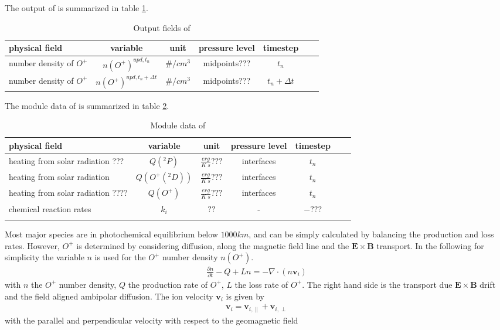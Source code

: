 %
The output of  is summarized in table
\ref{tab:output_oplus}.
%
\begin{table}[tb]
\begin{tabular}{|p{3.5cm} ||c|c|c|c|c|c|} \hline
physical field               & variable        & unit&pressure
level& timestep \\ \hline \hline
number density of $O^+$ &       $n(O^+)^{upd,t_n}$              & $\#/cm^3$   &  midpoints??? & $t_n$\\
number density of $O^+$ &       $n(O^+)^{upd,t_n+ \Delta t}$ &
$\#/cm^3$   &  midpoints??? & $t_n+ \Delta t$
\\ \hline \hline
\end{tabular}
\caption{Output fields of }
\label{tab:output_oplus}
\end{table}
%
%
The module data of  is summarized in table
\ref{tab:module_oplus}.
%
\begin{table}[tb]
\begin{tabular}{|p{3.5cm} ||c|c|c|c|c|c|} \hline
physical field               & variable        & unit&pressure
level& timestep \\ \hline \hline heating from solar radiation ???&
{$Q(^2P)$}     & $\frac{erg}{K \; s}???$   & interfaces  & $t_n$ \\
heating from solar radiation &
{$Q(O^+(^2D))$}     & $\frac{erg}{K \; s}???$   & interfaces  & $t_n$ \\
heating from solar radiation ????&
{$Q(O^+)$}     & $\frac{erg}{K \; s}???$   & interfaces  & $t_n$ \\
chemical reaction rates &
{$k_i$}     & $??$   & -  & $-???$ \\
\\ \hline \hline
\end{tabular}
\caption{Module data of }
\label{tab:module_oplus}
\end{table}
%
Most major species are in photochemical equilibrium below $1000 km$,
and can be simply calculated by balancing the production and loss
rates. However,  $O^+$ is determined by considering diffusion, along
the magnetic field line and the $\mathbf{E} \times \mathbf{B}$
transport. In the following for simplicity the variable $n$ is used
for the $O^+$ number density $n(O^+)$.
%
\begin{align}
  \frac{\partial n}{\partial t} -Q + L n = - \nabla \cdot (n
  \mathbf{v}_i) \label{eq:oplus_simple}
\end{align}
%
with $n$ the $O^+$ number density, $Q$ the production rate of $O^+$,
$L$ the loss rate of $O^+$. The right hand side is the transport due
$\mathbf{E} \times \mathbf{B}$ drift and the field aligned ambipolar
diffusion. The ion velocity $\mathbf{v}_i$ is given by
%
\begin{align}
  \mathbf{v}_i = \mathbf{v}_{i,\parallel} + \mathbf{v}_{i,\perp}
\end{align}
%
with the parallel and perpendicular velocity with respect to the
geomagnetic field
